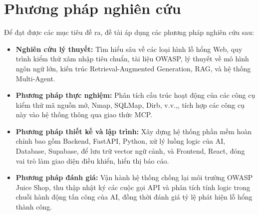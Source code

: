\section*{Phương pháp nghiên cứu}
Để đạt được các mục tiêu đề ra, đề tài áp dụng các phương pháp nghiên cứu sau:
\begin{itemize}
    \item \textbf{Nghiên cứu lý thuyết:} Tìm hiểu sâu về các loại hình lỗ hổng Web, quy trình kiểm thử xâm nhập tiêu chuẩn, tài liệu OWASP, lý thuyết về mô hình ngôn ngữ lớn, kiến trúc Retrieval-Augmented Generation, RAG, và hệ thống Multi-Agent.
    \item \textbf{Phương pháp thực nghiệm:} Phân tích cấu trúc hoạt động của các công cụ kiểm thử mã nguồn mở, Nmap, SQLMap, Dirb, v.v.,, tích hợp các công cụ này vào hệ thống thông qua giao thức MCP.
    \item \textbf{Phương pháp thiết kế và lập trình:} Xây dựng hệ thống phần mềm hoàn chỉnh bao gồm Backend, FastAPI, Python, xử lý luồng logic của AI, Database, Supabase, để lưu trữ vector ngữ cảnh, và Frontend, React, đóng vai trò làm giao diện điều khiển, hiển thị báo cáo.
    \item \textbf{Phương pháp đánh giá:} Vận hành hệ thống chống lại môi trường OWASP Juice Shop, thu thập nhật ký các cuộc gọi API và phân tích tính logic trong chuỗi hành động tấn công của AI, đồng thời đánh giá tỷ lệ phát hiện lỗ hổng thành công.
\end{itemize}

